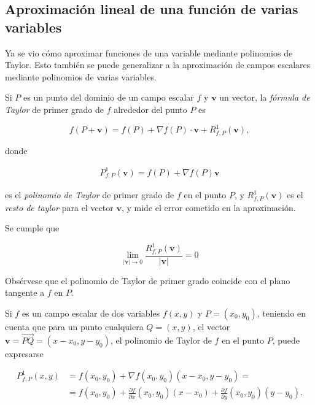 \documentclass[
  a4paper,
]{scrreport}
\theoremstyle{plain}
\theoremstyle{plain}
\theoremstyle{definition}
\theoremstyle{definition}
\theoremstyle{plain}
\theoremstyle{definition}
\theoremstyle{remark}
\begin{document}
\hypertarget{aproximaciuxf3n-lineal-de-una-funciuxf3n-de-varias-variables}{%
\subsection{Aproximación lineal de una función de varias
variables}\label{aproximaciuxf3n-lineal-de-una-funciuxf3n-de-varias-variables}}

Ya se vio cómo aproximar funciones de una variable mediante polinomios
de Taylor. Esto también se puede generalizar a la aproximación de campos
escalares mediante polinomios de varias variables.

Si \(P\) es un punto del dominio de un campo escalar \(f\) y
\(\mathbf{v}\) un vector, la \emph{fórmula de Taylor} de primer grado de
\(f\) alrededor del punto \(P\) es

\[f(P+\mathbf{v}) = f(P) + \nabla f(P)\cdot \mathbf{v} +R^1_{f,P}(\mathbf{v}),\]

donde

\[
\begin{aligned}
P^1_{f,P}(\mathbf{v}) = f(P)+\nabla f(P)\mathbf{v}
\end{aligned}
\]

es el \emph{polinomio de Taylor} de primer grado de \(f\) en el punto
\(P\), y \(R^1_{f,P}(\mathbf{v})\) es el \emph{resto de taylor} para el
vector \(\mathbf{v}\), y mide el error cometido en la aproximación.

Se cumple que

\[\lim_{|\mathbf{v}|\rightarrow 0} \frac{R^1_{f,P}(\mathbf{v})}{|\mathbf{v}|} = 0\]

Obsérvese que el polinomio de Taylor de primer grado coincide con el
plano tangente a \(f\) en \(P\).

Si \(f\) es un campo escalar de dos variables \(f(x,y)\) y
\(P=(x_0,y_0)\), teniendo en cuenta que para un punto cualquiera
\(Q=(x,y)\), el vector \(\mathbf{v}=\vec{PQ}=(x-x_0,y-y_0)\), el
polinomio de Taylor de \(f\) en el punto \(P\), puede expresarse

\[\begin{aligned}
P^1_{f,P}(x,y) &= f(x_0,y_0)+\nabla f(x_0,y_0)(x-x_0,y-y_0) =\\
&= f(x_0,y_0)+\frac{\partial f}{\partial x}(x_0,y_0)(x-x_0)+\frac{\partial f}{\partial y}(x_0,y_0)(y-y_0).
\end{aligned}
\]
\end{document}
